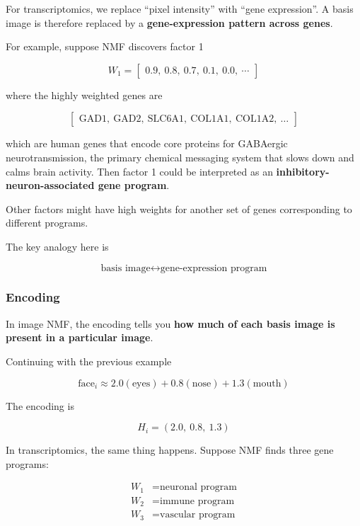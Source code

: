 \documentclass[11pt,a4paper]{article}
\begin{document}
For transcriptomics, we replace ``pixel intensity'' with ``gene expression''. A basis image is therefore replaced by a \textbf{gene-expression pattern across genes}.

For example, suppose NMF discovers factor 1

\[
W_1 =
\begin{bmatrix}
0.9, ~0.8 , ~ 0.7 , ~ 0.1 , ~ 0.0 , ~ \cdots
\end{bmatrix}
\]

where the highly weighted genes are

\[
\begin{bmatrix}
\text{GAD1},~\text{GAD2},~\text{SLC6A1}, ~\text{COL1A1}, ~\text{COL1A2}, ~\ldots
\end{bmatrix}
\]

which are human genes that encode core proteins for GABAergic neurotransmission, the primary chemical messaging system that slows down and calms brain activity. Then factor 1 could be interpreted as an \textbf{inhibitory-neuron-associated gene program}.

Other factors might have high weights for another set of genes corresponding to different programs. 

The key analogy here is

\[
\boxed{
\text{basis image}
\longleftrightarrow
\text{gene-expression program}
}
\]

\subsubsection{Encoding}

In image NMF, the encoding tells you \textbf{how much of each basis image is present in a particular image}.

Continuing with the previous example

\[
\text{face}_i
\approx
2.0(\text{eyes})
+
0.8(\text{nose})
+
1.3(\text{mouth})
\]

The encoding is

\[
H_i=(2.0,~0.8,~1.3)
\]

In transcriptomics, the same thing happens. Suppose NMF finds three gene programs:

\[
\begin{aligned}
W_1 &= \text{neuronal program}\\
W_2 &= \text{immune program}\\
W_3 &= \text{vascular program}
\end{aligned}
\]
\end{document}
